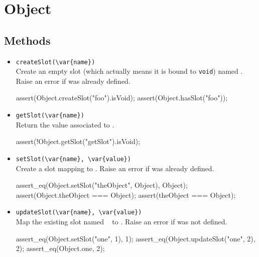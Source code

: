 \section{Object}

\subsection{Methods}

\begin{itemize}
\item \lstinline|createSlot(\var{name})|\\
  Create an empty slot (which actually means it is bound to
  \lstinline|void|) named .  Raise an error if 
  was already defined.
\begin{urbiscript}
assert(Object.createSlot("foo").isVoid);
assert(Object.hasSlot("foo"));
\end{urbiscript}

\item \lstinline|getSlot(\var{name})|\\
  Return the value associated to .
\begin{urbiscript}[firstnumber=last]
assert(!Object.getSlot("getSlot").isVoid);
\end{urbiscript}

\item \lstinline|setSlot(\var{name}, \var{value})|\\
  Create a slot  mapping to . Raise an error if
   was already defined.
\begin{urbiscript}[firstnumber=last]
assert_eq(Object.setSlot("theObject", Object), Object);
assert(Object.theObject === Object);
assert(theObject === Object);
\end{urbiscript}

\item \lstinline|updateSlot(\var{name}, \var{value})|\\
  Map the existing slot named \  to . Raise an
  error if  was not defined.
\begin{urbiscript}[firstnumber=last]
assert_eq(Object.setSlot("one", 1), 1);
assert_eq(Object.updateSlot("one", 2), 2);
assert_eq(Object.one, 2);
\end{urbiscript}
\end{itemize}

